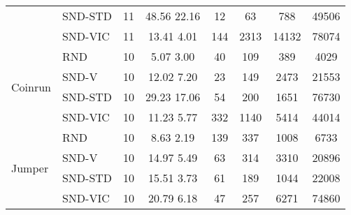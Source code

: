 \documentclass[a4paper,11pt]{elsarticle}
\begin{document}
\begin{table}[t!]
\begin{tabular}{l|l|cccccc}
& \multicolumn{1}{l|}{SND-STD} & \multicolumn{1}{c}{11} & \multicolumn{1}{c}{48.56  22.16} & \multicolumn{1}{c}{12} & \multicolumn{1}{c}{63} & \multicolumn{1}{c}{788} & \multicolumn{1}{c}{49506} \\
& \multicolumn{1}{l|}{SND-VIC} & \multicolumn{1}{c}{11} & \multicolumn{1}{c}{13.41  4.01} & \multicolumn{1}{c}{144} & \multicolumn{1}{c}{2313} & \multicolumn{1}{c}{14132} & \multicolumn{1}{c}{78074} \\
\hline \multirow{4}{*}{Coinrun}
& \multicolumn{1}{l|}{RND} & \multicolumn{1}{c}{10} & \multicolumn{1}{c}{5.07  3.00} & \multicolumn{1}{c}{40} & \multicolumn{1}{c}{109} & \multicolumn{1}{c}{389} & \multicolumn{1}{c}{4029} \\
& \multicolumn{1}{l|}{SND-V} & \multicolumn{1}{c}{10} & \multicolumn{1}{c}{12.02  7.20} & \multicolumn{1}{c}{23} & \multicolumn{1}{c}{149} & \multicolumn{1}{c}{2473} & \multicolumn{1}{c}{21553} \\
& \multicolumn{1}{l|}{SND-STD} & \multicolumn{1}{c}{10} & \multicolumn{1}{c}{29.23  17.06} & \multicolumn{1}{c}{54} & \multicolumn{1}{c}{200} & \multicolumn{1}{c}{1651} & \multicolumn{1}{c}{76730} \\
& \multicolumn{1}{l|}{SND-VIC} & \multicolumn{1}{c}{10} & \multicolumn{1}{c}{11.23  5.77} & \multicolumn{1}{c}{332} & \multicolumn{1}{c}{1140} & \multicolumn{1}{c}{5414} & \multicolumn{1}{c}{44014} \\
\hline \multirow{4}{*}{Jumper}
& \multicolumn{1}{l|}{RND} & \multicolumn{1}{c}{10} & \multicolumn{1}{c}{8.63  2.19} & \multicolumn{1}{c}{139} & \multicolumn{1}{c}{337} & \multicolumn{1}{c}{1008} & \multicolumn{1}{c}{6733} \\
& \multicolumn{1}{l|}{SND-V} & \multicolumn{1}{c}{10} & \multicolumn{1}{c}{14.97  5.49} & \multicolumn{1}{c}{63} & \multicolumn{1}{c}{314} & \multicolumn{1}{c}{3310} & \multicolumn{1}{c}{20896} \\
& \multicolumn{1}{l|}{SND-STD} & \multicolumn{1}{c}{10} & \multicolumn{1}{c}{15.51  3.73} & \multicolumn{1}{c}{61} & \multicolumn{1}{c}{189} & \multicolumn{1}{c}{1044} & \multicolumn{1}{c}{22008} \\
& \multicolumn{1}{l|}{SND-VIC} & \multicolumn{1}{c}{10} & \multicolumn{1}{c}{20.79  6.18} & \multicolumn{1}{c}{47} & \multicolumn{1}{c}{257} & \multicolumn{1}{c}{6271} & \multicolumn{1}{c}{74860} \\
\hline\hline
\end{tabular}
\label{tab:analysis1}
\end{table}
\end{document}

